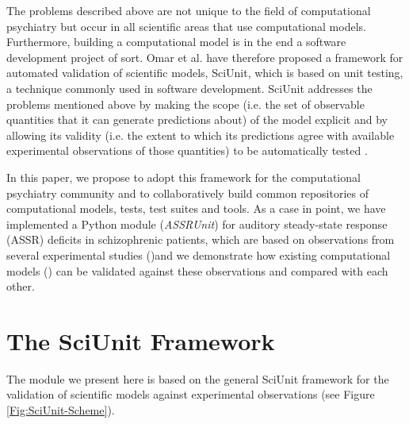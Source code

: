 \documentclass[CompPsych]{stjour}
\begin{document}
The problems described above are not unique to the field of computational psychiatry but occur in all scientific areas that use computational models.
Furthermore, building a computational model is in the end a software development project of sort. Omar et al. \cite{Omar2014}
have therefore
proposed a framework for automated validation of scientific models, SciUnit, which is based on unit testing, a technique commonly used in software 
development.
SciUnit addresses the problems mentioned above by making the scope (i.e. the set of observable
quantities that it can generate predictions about) of the model explicit and by allowing its validity (i.e. the extent to which its predictions
agree with available experimental observations of those quantities) to be automatically tested \cite{Omar2014}.

In this paper, we  propose to adopt this framework for the computational psychiatry community and to collaboratively build
common repositories of computational models, tests, test suites and tools.
As a case in point, we have implemented a Python module (\textit{ASSRUnit}) for auditory steady-state response (ASSR) deficits in schizophrenic patients, which are based on 
observations from
several experimental studies (\cite{Krishnan2009,Vierling2008,Kwon1999})and we demonstrate
how existing computational models (\cite{Metzner2016,Beeman2013,Vierling2008,Metzner2017}) can be validated against these observations and compared with each 
other.


\section{The SciUnit Framework}
The module we present here is based on the general SciUnit framework for the validation of scientific models against 
experimental observations \cite{Omar2014} (see Figure \ref{Fig:SciUnit-Scheme}).
\end{document}
